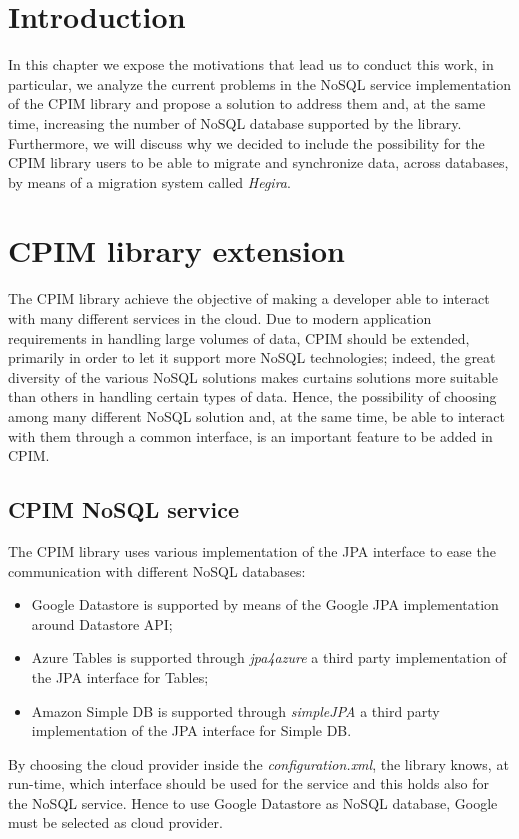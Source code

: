 \section{Introduction}
In this chapter we expose the motivations that lead us to conduct this work, in particular, we analyze the current problems in the NoSQL service implementation of the CPIM library and propose a solution to address them and, at the same time, increasing the number of NoSQL database supported by the library.
\noindent Furthermore, we will discuss why we decided to include the possibility for the CPIM library users to be able to migrate and synchronize data, across databases, by means of a migration system called \textit{Hegira}.

\section{CPIM library extension}
The CPIM library achieve the objective of making a developer able to interact with many different services in the cloud. Due to modern application requirements in handling large volumes of data, CPIM should be extended, primarily in order to let it support more NoSQL technologies; indeed, the great diversity of the various NoSQL solutions makes curtains solutions more suitable than others in handling certain types of data. Hence, the possibility of choosing among many different NoSQL solution and, at the same time, be able to interact with them through a common interface, is an important feature to be added in CPIM. 

\subsection{CPIM NoSQL service}
The CPIM library uses various implementation of the JPA interface to ease the communication with different NoSQL databases:
\begin{itemize}
\item Google Datastore is supported by means of the Google JPA implementation around Datastore API;
\item Azure Tables is supported through \textit{jpa4azure} a third party implementation of the JPA interface for Tables;
\item Amazon Simple DB is supported through \textit{simpleJPA} a third party implementation of the JPA interface for Simple DB.
\end{itemize}
\noindent By choosing the cloud provider inside the \textit{configuration.xml}, the library knows, at run-time, which interface should be used for the service and this holds also for the NoSQL service. Hence to use Google Datastore as NoSQL database, Google must be selected as cloud provider.

